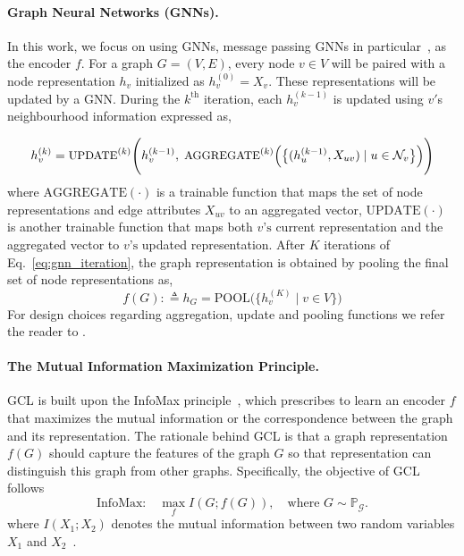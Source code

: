 \paragraph{Graph Neural Networks (GNNs).} In this work, we focus on using GNNs, message passing GNNs in particular~\cite{gilmer2017neural}, as the encoder $f$. For a graph $G=(V,E)$, every node $v\in V$ will be paired with a node representation $h_v$ initialized as $h_v^{(0)}=X_v$. These representations will be updated by a GNN. During the $k^{\text{th}}$ iteration, each $h_v^{(k-1)}$ is updated using $v'$s neighbourhood information expressed as,

\vspace{-4mm}
\begin{equation}
\label{eq:gnn_iteration}
   \small h_v^{(k)} = \text{UPDATE}^{(k)} \Bigg( h_v^{(k-1)}, \; \text{AGGREGATE}^{(k)} \Big( \big\{(h_u^{(k-1)}, X_{uv})  \mid u \in \mathcal{N}_v\big\} \Big) \Bigg)
\end{equation}
 where $\text{AGGREGATE}(\cdot)$ is a trainable function that maps the set of node representations and edge attributes $X_{uv}$ to an aggregated vector, $\text{UPDATE}(\cdot)$ is another trainable function that maps both $v\text{'s}$ current representation and the aggregated vector to $v\text{'s}$ updated representation.
After $K$ iterations of Eq.~\ref{eq:gnn_iteration}, the graph representation is obtained by pooling the final set of node representations as,
\begin{equation}
    \label{eq:pooling}
    f(G):\triangleq h_{G} = \text{POOL}\big(\{ h_v^{(K)} \mid v \in V \}\big)
\end{equation}
For design choices regarding aggregation, update and pooling functions we refer the reader to \cite{zhang2020deep_survey, chami2020machine, hamilton2020book}. \vspace{-5mm}
\paragraph{The Mutual Information Maximization Principle.} 
GCL is built upon the InfoMax principle~\cite{linsker1988self}, which prescribes to learn an encoder $f$ that maximizes the mutual information or the correspondence between the graph and its representation. The rationale behind GCL is that a graph representation $f(G)$ should capture the features of the graph $G$ so that representation can distinguish this graph from other graphs. Specifically, the objective of GCL follows
\begin{equation} \label{eq:infomax}
   \text{InfoMax:}\quad \max_{f} I(G ; f(G)), \quad \text{where } G\sim \mathbb{P}_{\mathcal{G}}.
\end{equation}
where $I(X_1;X_2)$ denotes the mutual information between two random variables $X_1$ and $X_2$~\cite{cover2012elements}. %

